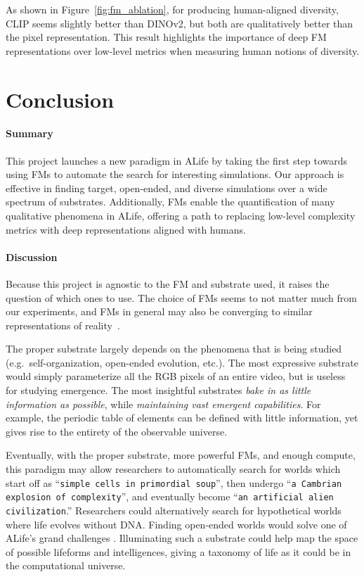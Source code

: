 \documentclass{article}
\begin{document}
As shown in Figure~\ref{fig:fm_ablation}, for producing human-aligned diversity, CLIP seems slightly better than DINOv2, but both are qualitatively better than the pixel representation.
This result highlights the importance of deep FM representations over low-level metrics when measuring human notions of diversity.



\vspace{-0.1in}
\section{Conclusion}
\vspace{-0.1in}
\paragraph{Summary}
This project launches a new paradigm in ALife by taking the first step towards using FMs to automate the search for interesting simulations.
Our approach is effective in finding target, open-ended, and diverse simulations over a wide spectrum of substrates.
Additionally, FMs enable the quantification of many qualitative phenomena in ALife, offering a path to replacing low-level complexity metrics with deep representations aligned with humans.



\vspace{-0.1in}
\paragraph{Discussion}
Because this project is agnostic to the FM and substrate used, it raises the question of which ones to use.
The choice of FMs seems to not matter much from our experiments, and FMs in general may also be converging to similar representations of reality~\citep{huh2024platonic}.

The proper substrate largely depends on the phenomena that is being studied (e.g.\ self-organization, open-ended evolution, etc.).
The most expressive substrate would simply parameterize all the RGB pixels of an entire video, but is useless for studying emergence.
The most insightful substrates \textit{bake in as little information as possible}, while \textit{maintaining vast emergent capabilities}.
For example, the periodic table of elements can be defined with little information, yet gives rise to the entirety of the observable universe.

Eventually, with the proper substrate, more powerful FMs, and enough compute, this paradigm may allow researchers to automatically search for worlds which start off as ``\texttt{simple cells in primordial soup}'', then undergo ``\texttt{a Cambrian explosion of complexity}'', and eventually become ``\texttt{an artificial alien civilization}.''
Researchers could alternatively search for hypothetical worlds where life evolves without DNA.
Finding open-ended worlds would solve one of ALife's grand challenges \citep{bedau2000open, stanley2017open}.
Illuminating such a substrate could help map the space of possible lifeforms and intelligences, giving a taxonomy of life as it could be in the computational universe.
\end{document}
